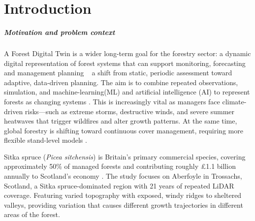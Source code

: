 
\chapter{Introduction}  \label{ch:intro}


\paragraph*{Motivation and problem context}
A Forest Digital Twin is a wider long-term goal for the forestry sector: a dynamic digital representation of forest systems that can support monitoring, forecasting and management planning ~ a shift from static, periodic assessment toward adaptive, data-driven planning. The aim is to combine repeated observations, simulation, and machine-learning(ML) and artificial intelligence (AI) to represent forests as changing systems \cite{baskent2026Review_C1_SS, buonocore2022Proposal_C1_SS}. This is increasingly vital as managers face climate-driven risks—such as extreme storms, destructive winds, and severe summer heatwaves that trigger wildfires and alter growth patterns. At the same time, global forestry is shifting toward continuous cover management, requiring more flexible stand-level models \cite{ForestResearch2009Evidence_C1_SS}.

Sitka spruce (\textit{Picea sitchensis}) is Britain's primary commercial species, covering approximately 50\% of managed forests \cite{ForestResearch2026Sitka_C1_SS} and contributing roughly \pounds1.1 billion annually to Scotland's economy \cite{ScottishForestry2026Future_C1_SS, mason2011Sitka_C1_SS}. The study focuses on Aberfoyle in Trossachs, Scotland, a Sitka spruce-dominated region with 21 years of repeated LiDAR coverage. Featuring varied topography with exposed, windy ridges to sheltered valleys, providing variation that causes different growth trajectories in different areas of the forest.



